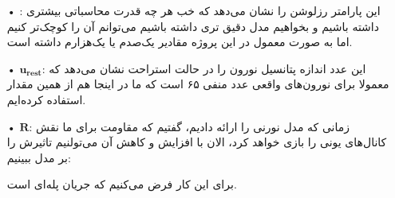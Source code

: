 \documentclass[12pt]{extreport}
\theoremstyle{definition}
\begin{document}
\begin{itemize}

\item[•] \textbf{}:
این پارامتر رزلوشن را نشان می‌دهد که خب هر چه قدرت محاسباتی بیشتری داشته باشیم و بخواهیم مدل دقیق تری داشته باشیم می‌توانم آن را کوچک‌تر کنیم اما به صورت معمول در این پروژه مقادیر یک‌صدم یا یک‌هزارم داشته است.

\item[•] \textbf{$\mathbf{u_{rest}}$}:
این عدد اندازه پتانسیل نورون را در حالت استراحت نشان می‌دهد که معمولا برای نورون‌های واقعی عدد منفی ۶۵ است که ما در اینجا هم از همین مقدار استفاده کرده‌ایم.

\item[•] $\mathbf{R}$:
زمانی که مدل نورنی  را ارائه دادیم، گفتیم که مقاومت برای ما نقش کانال‌های یونی را بازی خواهد کرد، الان با افزایش و کاهش آن می‌تولنیم تاثیرش را بر مدل ببینیم:

برای این کار فرض می‌کنیم که جریان پله‌ای است.


\end{itemize}
\end{document}

